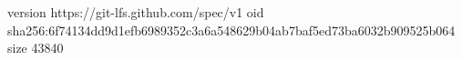 version https://git-lfs.github.com/spec/v1
oid sha256:6f74134dd9d1efb6989352c3a6a548629b04ab7baf5ed73ba6032b909525b064
size 43840
